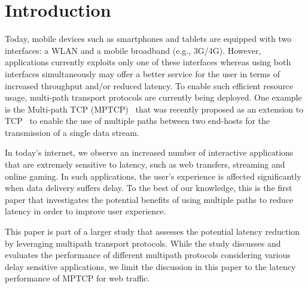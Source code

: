 \section{Introduction}
\label{sec:introduction}
Today, mobile devices such as smartphones and tablets are equipped with two interfaces: a WLAN and a mobile broadband
(e.g., 3G/4G). However, applications currently
exploits only one of these interfaces whereas using both interfaces simultaneously may offer a
better service for the user in terms of increased throughput and/or reduced
latency. To enable such efficient resource usage, multi-path transport protocols
are currently being deployed. One example is the Multi-path TCP
(MPTCP)~\cite{RFC6824} that was recently proposed as an extension to
TCP~\cite{RFC793} to enable the use of multiple paths between two end-hosts
for the transmission of a single data stream.

In today's internet, we observe an increased number of interactive applications
that are extremely sensitive to latency, such as web transfers, streaming and online gaming. In such applications, the user's experience is affected significantly when data delivery suffers delay. To the best of our knowledge, this is the first paper that investigates the potential benefits of using multiple paths to reduce latency in order to improve user experience.

This paper is part of a larger study that assesses the potential latency reduction by leveraging multipath transport protocols. While the study discusses and evaluates the performance of different multipath protocols considering various delay sensitive applications, we limit the discussion in this paper to the latency performance of MPTCP for web traffic.
